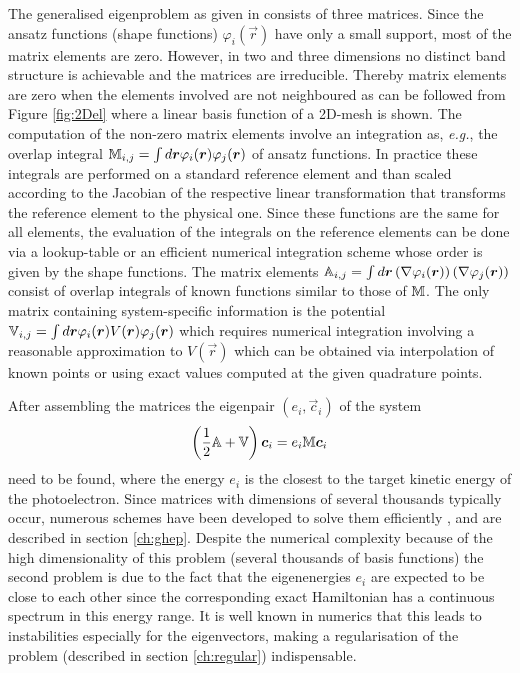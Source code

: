 The generalised eigenproblem as given in  consists of three matrices.
Since the ansatz functions (shape functions) $\varphi_i(\vec{r})$ have only a small support, most of the matrix elements are zero. 
However, in two and three dimensions no distinct band structure is achievable and the matrices are irreducible.
Thereby matrix elements are zero when the elements involved are not neighboured as can be followed from Figure \ref{fig:2Del} where a linear basis function of a 2D-mesh is shown.
The computation of the non-zero matrix elements involve an integration as, \textit{e.g.}, the overlap integral $\mathbb{M}_{i,j}=\int d \bm{r} \varphi_i(\bm{r}) \varphi_j(\bm{r})$ of ansatz functions.
In practice these integrals are performed on a standard reference element and than scaled according to the Jacobian of the respective linear transformation that transforms the reference element to the physical one.
Since these functions are the same for all elements, the evaluation of the integrals on the reference elements can be done via a lookup-table or an efficient numerical integration scheme whose order is given by the shape functions.
The matrix elements $\mathbb{A}_{i,j}=\int d \bm{r} \left(\nabla \varphi_i(\bm{r})\right)\left(\nabla \varphi_j(\bm{r})\right)$ consist of overlap integrals of known functions similar to those of $\mathbb{M}$.
The only matrix containing system-specific information is the potential $\mathbb{V}_{i,j}=\int d \bm{r} \varphi_i(\bm{r}) V(\bm{r}) \varphi_j(\bm{r})$ which requires numerical integration involving a reasonable approximation to $V(\vec{r})$ which can be obtained via interpolation of known points or using exact values computed at the given quadrature points.

After assembling the matrices the eigenpair $(e_i, \vec{c}_i)$ of the system
\begin{equation} \label{eq:SEmat2}
\left(\frac 12 \mathbb{A}+\mathbb{V}\right)\bm{c}_i = e_i \mathbb{M}\bm{c}_i
\end{equation}
need to be found, where the energy $e_i$ is the closest to the target kinetic energy of the photoelectron.
Since matrices with dimensions of several thousands typically occur, numerous schemes have been developed to solve them efficiently \cite{davidson,arnoldi, gpusolver,krylov}, and are described in section \ref{ch:ghep}.
Despite the numerical complexity because of the high dimensionality of this problem (several thousands of basis functions) the second problem is due to the fact that the eigenenergies $e_i$ are expected to be close to each other since the corresponding exact Hamiltonian has a continuous spectrum in this energy range.
It is well known in numerics that this leads to instabilities especially for the eigenvectors, making a regularisation of the problem (described in section \ref{ch:regular}) indispensable.

